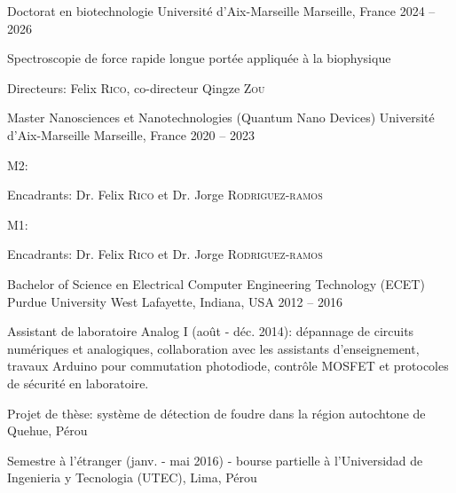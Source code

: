 
\begin{cventries}
  \cventry
  {Doctorat en biotechnologie}
  {Universit\'e d'Aix-Marseille}
  {Marseille, France}
  {2024 -- 2026}
  {
    \begin{cvitems}
      \item{{Spectroscopie de force rapide longue port\'ee appliqu\'ee \`a la biophysique}}
      \item{Directeurs: Felix \textsc{Rico}, co-directeur Qingze \textsc{Zou}}
    \end{cvitems}
    \vspace{1em}
  }

  \cventry
  {Master Nanosciences et Nanotechnologies (Quantum Nano Devices)}
  {Universit\'e d'Aix-Marseille}
  {Marseille, France}
  {2020 -- 2023}
  {
    \begin{cvitems}
      \item{M2: }
      \item{Encadrants: Dr. Felix \textsc{Rico} et Dr. Jorge \textsc{Rodriguez-ramos}}
      \item{M1: }
      \item{Encadrants: Dr. Felix \textsc{Rico} et Dr. Jorge \textsc{Rodriguez-ramos}}
    \end{cvitems}
    \vspace{1em}
  }

  \cventry
  {Bachelor of Science en Electrical Computer Engineering Technology (ECET)}
  {Purdue University}
  {West Lafayette, Indiana, USA}
  {2012 -- 2016}
  {
    \begin{cvitems}
      \item{Assistant de laboratoire Analog I (ao\^ut - d\'ec. 2014): d\'epannage de circuits num\'eriques et analogiques, collaboration avec les assistants d'enseignement, travaux Arduino pour commutation photodiode, contr\^ole MOSFET et protocoles de s\'ecurit\'e en laboratoire.}
      \item{Projet de th\`ese: syst\`eme de d\'etection de foudre dans la r\'egion autochtone de Quehue, P\'erou}
      \item{Semestre \`a l'\'etranger (janv. - mai 2016) - bourse partielle \`a l'Universidad de Ingenieria y Tecnologia (UTEC), Lima, P\'erou}
    \end{cvitems}
    \vspace{1em}
  }

\end{cventries}
